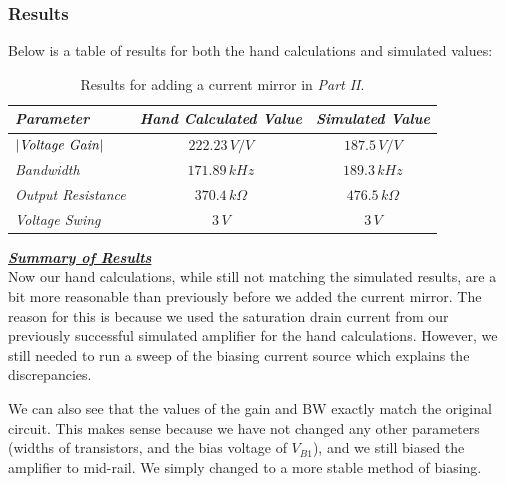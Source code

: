 \documentclass[12pt, fleqn]{article}
\begin{document}
\subsubsection{Results}
Below is a table of results for both the hand calculations and simulated values:

\begin{table}[H]
\centering
\setlength{\tabcolsep}{20pt}
\renewcommand{\arraystretch}{1.5}
\begin{tabular}{|l|c|c|}
    \hline
    \textbf{\textit{Parameter}} & \textbf{\textit{Hand Calculated Value}} & \textbf{\textit{Simulated Value}}\\
    \hline
    $\left|\text{\textit{Voltage Gain}}\right|$ & $222.23\,V/V$ & $187.5\,V/V$\\
    \hline
    \textit{Bandwidth} & $171.89\,kHz$ & $189.3\,kHz$\\
    \hline
    \textit{Output Resistance} & $370.4\,k\Omega$ & $476.5\,k\Omega$\\
    \hline
    \textit{Voltage Swing} & $3\,V$ & $3\,V$\\
    \hline
\end{tabular}
\caption{Results for adding a current mirror in \textit{Part II}.}
\end{table}
\noindent
\underline{\textbf{\textit{Summary of Results}}}\\[0.25cm]
Now our hand calculations, while still not matching the simulated results, are a bit more reasonable than previously before we added the current mirror.  The reason for this is because we used the saturation drain current from our previously successful simulated amplifier for the hand calculations.  However, we still needed to run a sweep of the biasing current source which explains the discrepancies.

We can also see that the values of the gain and BW exactly match the original circuit.  This makes sense because we have not changed any other parameters (widths of transistors, and the bias voltage of $V_{B1}$), and we still biased the amplifier to mid-rail.  We simply changed to a more stable method of biasing.
\newpage
\end{document}
